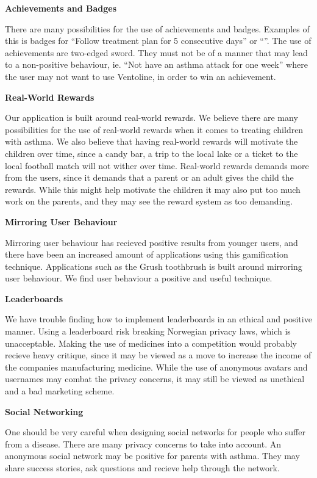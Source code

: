 \textbf{Achievements and Badges}

There are many possibilities for the use of achievements and badges. Examples of this is badges for ``Follow treatment plan for 5 consecutive days'' or ``''. The use of achievements are two-edged sword. They must not be of a manner that may lead to a non-positive behaviour, ie. ``Not have an asthma attack for one week'' where the user may not want to use Ventoline, in order to win an achievement. 

\textbf{Real-World Rewards}

Our application is built around real-world rewards. We believe there are many possibilities for the use of real-world rewards when it comes to treating children with asthma. We also believe that having real-world rewards will motivate the children over time, since a candy bar, a trip to the local lake or a ticket to the local football match will not wither over time. 
Real-world rewards demands more from the users, since it demands that a parent or an adult gives the child the rewards. While this might help motivate the children it may also put too much work on the parents, and they may see the reward system as too demanding.

\textbf{Mirroring User Behaviour}

Mirroring user behaviour has recieved positive results from younger users, and there have been an increased amount of applications using this gamification technique. Applications such as the Grush toothbrush is built around mirroring user behaviour. 
We find user behaviour a positive and useful technique.

\textbf{Leaderboards}

We have trouble finding how to implement leaderboards in an ethical and positive manner. Using a leaderboard risk breaking Norwegian privacy laws, which is unacceptable. Making the use of medicines into a competition would probably recieve heavy critique, since it may be viewed as a move to increase the income of the companies manufacturing medicine. While the use of anonymous avatars and usernames may combat the privacy concerns, it may still be viewed as unethical and a bad marketing scheme.  

\textbf{Social Networking}

One should be very careful when designing social networks for people who suffer from a disease. There are many privacy concerns to take into account. An anonymous social network may be positive for parents with asthma. They may share success stories, ask questions and recieve help through the network. 

